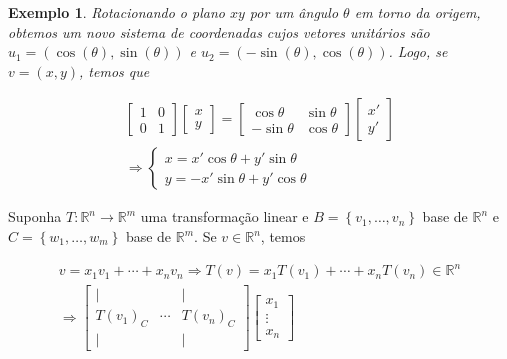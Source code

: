 \documentclass{article}
\newtheorem*{example}{Exemplo}
\begin{document}
\begin{example}
	Rotacionando o plano $xy$ por um ângulo $\theta$ em torno da origem, obtemos um novo sistema de coordenadas cujos vetores unitários são $u_1 = (\cos(\theta), \sin(\theta))$ e $u_2 = (-\sin(\theta), \cos(\theta))$. Logo, se $v = (x,y)$, temos que
	
	\begin{align*}
	\begin{bmatrix}
	1 & 0 \\
	0 & 1
	\end{bmatrix}\begin{bmatrix}
	x\\
	y
	\end{bmatrix} = \begin{bmatrix}
	\cos\theta & \sin\theta \\
	-\sin\theta & \cos\theta
	\end{bmatrix}\begin{bmatrix}
	x'\\
	y'
	\end{bmatrix} \\
	\Rightarrow \begin{cases}
	x = x'\cos\theta + y'\sin\theta \\
	y = -x'\sin\theta + y'\cos\theta
	\end{cases}
	\end{align*}
	
\end{example}

\par\vspace{0.3cm} Suponha $T:\mathbb{R}^n\to\mathbb{R}^m$ uma transformação linear e $B = \left\{v_1, \dots ,v_n \right\}$ base de $\mathbb{R}^n$ e $C = \left\{ w_1, \dots, w_m \right\}$ base de $\mathbb{R}^m$. Se $v\in\mathbb{R}^n$, temos

\begin{align*}
v = x_1v_1 + \cdots + x_nv_n \Rightarrow T(v) = x_1T(v_1) + \cdots + x_nT(v_n)\in\mathbb{R}^n \\
\Rightarrow \begin{bmatrix}
\vert & & \vert \\
T(v_1)_C & \cdots & T(v_n)_C \\
\vert & & \vert
\end{bmatrix}\begin{bmatrix}
x_1\\
\vdots\\
x_n
\end{bmatrix}
\end{align*}
\end{document}
